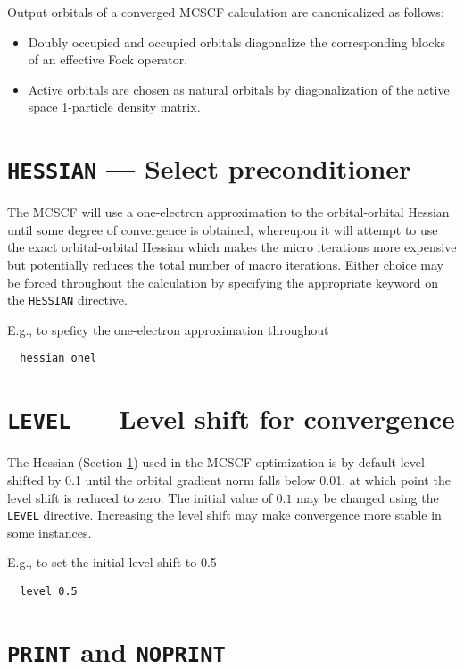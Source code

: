 Output orbitals of a converged MCSCF calculation are canonicalized as
follows:
\begin{itemize}
\item Doubly occupied and occupied orbitals diagonalize the
  corresponding blocks of an effective Fock operator.
\item Active orbitals are chosen as natural orbitals by
  diagonalization of the active space 1-particle density matrix.
\end{itemize}

\section{{\tt HESSIAN} --- Select preconditioner}
\label{sec:mcscfhessian}

The MCSCF will use a one-electron approximation to the orbital-orbital
Hessian until some degree of convergence is obtained, whereupon it
will attempt to use the exact orbital-orbital Hessian which makes the
micro iterations more expensive but potentially reduces the total
number of macro iterations.  Either choice may be forced throughout
the calculation by specifying the appropriate keyword on the
\verb+HESSIAN+ directive.

E.g., to speficy the one-electron approximation throughout
\begin{verbatim}
  hessian onel
\end{verbatim}

\section{{\tt LEVEL} --- Level shift for convergence}

The Hessian (Section \ref{sec:mcscfhessian}) used in the MCSCF
optimization is by default level shifted by 0.1 until the orbital
gradient norm falls below 0.01, at which point the level shift is
reduced to zero.  The initial value of $0.1$ may be changed using
the \verb+LEVEL+ directive.  Increasing the level shift may make
convergence more stable in some instances.

E.g., to set the initial level shift to 0.5
\begin{verbatim}
  level 0.5
\end{verbatim}

\section{{\tt PRINT} and {\tt NOPRINT}}

